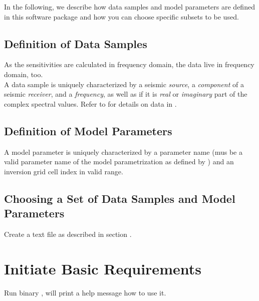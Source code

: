In the following, we describe how data samples and model parameters are defined in this software package and how you can 
choose specific subsets to be used. 
\subsection{Definition of Data Samples}
As the sensitivities are calculated in frequency domain, the data live in frequency domain, too.\\
A data sample is uniquely characterized by a seismic \emph{source}, a \emph{component} 
of a seismic \emph{receiver}, and a \emph{frequency}, as well as if it is \emph{real} or \emph{imaginary} part 
of the complex spectral values. Refer to  for details on data in \ASKI.
\subsection{Definition of Model Parameters} \label{basic_steps,sec:dmspace,sub:mparam}
A model parameter is uniquely  characterized by a parameter name (mus be a valid parameter name of the model
parametrization as defined by  ) 
and an inversion grid cell index in valid range.
\subsection{Choosing a Set of Data Samples and Model Parameters}
Create a text file as described in section .
%
\section{Initiate Basic Requirements} \label{basic_steps,sec:initBasics}
%
Run binary ,  will print a help message how to use it.

